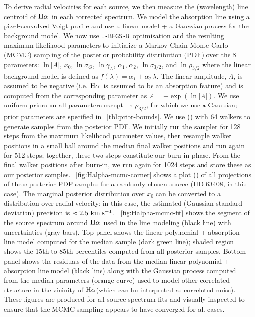 \documentclass[modern, letterpaper]{aastex61}
\newcommand{\lbfgsb}{\texttt{L-BFGS-B}}
\newcommand{\Ha}{\ensuremath{{\rm H}\alpha}}
\begin{document}
To derive radial velocities for each source, we then measure the (wavelength)
line centroid of \Ha\ in each corrected spectrum.
We model the absorption line using a pixel-convolved Voigt profile and use a
linear model + a Gaussian process for the background model.
We now use \lbfgsb\ optimization and the resulting maximum-likelihood parameters
to initialize a Markov Chain Monte Carlo (MCMC) sampling of the posterior
probability distribution (PDF) over the 8 parameters: $\ln |A|$, $x_0$,
$\ln\sigma_G$, $\ln\gamma_L$, $\alpha_1$, $\alpha_2$, $\ln\sigma_{3/2}$, and
$\ln\rho_{3/2}$ where the linear background model is defined as $f(\lambda) =
\alpha_1 + \alpha_2\,\lambda$.
The linear amplitude, $A$, is assumed to be negative (i.e. \Ha\ is assumed to be
an absorption feature) and is computed from the corresponding parameter as $A =
-\exp(\ln |A|)$.
We use uniform priors on all parameters except $\ln\rho_{3/2}$, for which we use
a Gaussian; prior parameters are specified in \tablename~\ref{tbl:prior-bounds}.
We use  (\citealt{Foreman-Mackey:2013}) with 64 walkers to
generate samples from the posterior PDF.
We initially run the sampler for 128 steps from the maximum likelihood parameter
values, then resample walker positions in a small ball around the median final
walker positions and run again for 512 steps; together, these two steps
constitute our burn-in phase.
From the final walker positions after burn-in, we run again for 1024 steps and
store these as our posterior samples.
\figurename~\ref{fig:Halpha-mcmc-corner} shows a  plot
(\citealt{Foreman-Mackey:2016}) of all projections of these posterior PDF
samples for a randomly-chosen source (HD 63408, in this case).
The marginal posterior distribution over $x_0$ can be converted to a
distribution over radial velocity; in this case, the estimated (Gaussian
standard deviation) precision is $\approx 2.5~\mathrm{km}~\mathrm{s}^{-1}$.
\figurename~\ref{fig:Halpha-mcmc-fit} shows the segment of the source spectrum
around \Ha\ used in the line modeling (black line) with uncertainties (gray
bars).
Top panel shows the linear polynomial + absorption line model computed for the
median sample (dark green line); shaded region shows the 15th to 85th
percentiles computed from all posterior samples.
Bottom panel shows the residuals of the data from the median linear polynomial +
absorption line model (black line) along with the Gaussian process computed from
the median parameters (orange curve) used to model other correlated structure in
the vicinity of \Ha (which can be interpreted as correlated noise).
These figures are produced for all source spectrum fits and visually inspected
to ensure that the MCMC sampling appears to have converged for all cases.
\end{document}
